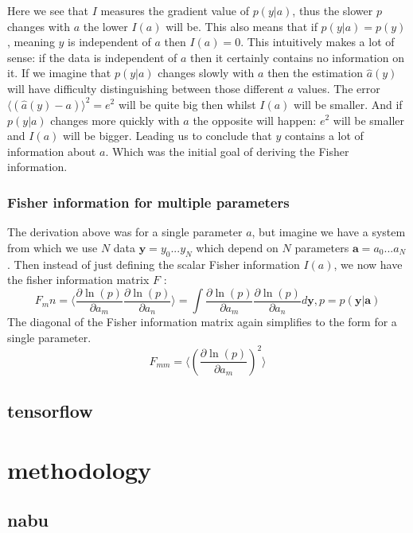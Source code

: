 \documentclass[a4paper]{article}
\begin{document}
Here we see that $I$ measures the gradient value of $p(y|a)$, thus the slower $p$ changes with $a$ the lower $I(a)$ will be. This also means that if $p(y|a) = p(y)$, meaning $y$ is independent of $a$ then $I(a) = 0$. This intuitively makes a lot of sense: if the data is independent of $a$ then it certainly contains no information on it. If we imagine that $p(y|a)$ changes slowly with $a$ then the estimation $\hat{a}(y)$ will have difficulty distinguishing between those different $a$ values. The error $\langle (\hat{a} (y) - a) \rangle^2 = e^2$ will be quite big then whilst $I(a)$ will be smaller. And if $p(y|a)$ changes more quickly with $a$ the opposite will happen: $e^2$ will be smaller and $I(a)$ will be bigger. Leading us to conclude that $y$ contains a lot of information about $a$. Which was the initial goal of deriving the Fisher information.

\subsubsection{Fisher information for multiple parameters}
The derivation above was for a single parameter $a$, but imagine we have a system from which we use $N$ data $\bm{y} = y_0...y_N$ which depend on $N$ parameters $\bm{a} = a_0...a_N$. Then instead of just defining the scalar Fisher information $I(a)$, we now have the fisher information matrix $F$ \cite[p. ~13]{Fisher}: 
\begin{equation}
F_mn = \langle  \frac{\partial \ln(p)}{\partial a_m} \frac{\partial \ln(p)}{\partial a_n} \rangle = \int \frac{\partial \ln(p)}{\partial a_m} \frac{\partial \ln(p)}{\partial a_n} d\bm{y} , p=p(\bm{y}|\bm{a}) 
\end{equation}
The diagonal of the Fisher information matrix again simplifies to the form for a single parameter.
\begin{equation}
F_{mm} = \langle (\frac{\partial \ln(p)}{\partial a_m})^2 \rangle
\end{equation}

\subsection{tensorflow}
\section{methodology}
\subsection{nabu}
\end{document}
